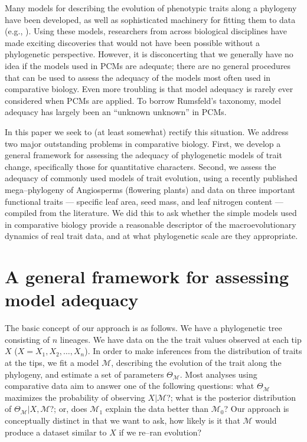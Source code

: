 \documentclass[a4paper,12pt]{article}
\begin{document}
Many models for describing the evolution of phenotypic traits along a phylogeny have been developed, as well as sophisticated machinery for fitting them to data (e.g., \citep{Felsenstein1985, Hansen1997, Pagel1999, Blomberg2003, ButlerKing2004, Omeara2006, Eastman2011, Beaulieu2012, SlaterMEE, UyedaBayou}). Using these models, researchers from across biological disciplines have made exciting discoveries that would not have been possible without a phylogenetic perspective. However, it is disconcerting that we generally have no idea if the models used in PCMs are adequate; there are no general procedures that can be used to assess the adequacy of the models most often used in comparative biology. Even more troubling is that model adequacy is rarely ever considered when PCMs are applied. To borrow Rumsfeld's taxonomy, model adequacy has largely been an ``unknown unknown'' in PCMs.

In this paper we seek to (at least somewhat) rectify this situation. We address two major outstanding problems in comparative biology. First, we develop a general framework for assessing the adequacy of phylogenetic models of trait change, specifically those for quantitative characters. Second, we assess the adequacy of commonly used models of trait evolution, using a recently published mega--phylogeny of Angiosperms (flowering plants) \citep{Zanne2013} and data on three important functional traits --- specific leaf area, seed mass, and leaf nitrogen content --- compiled from the literature. We did this to ask whether the simple models used in comparative biology provide a reasonable descriptor of the macroevolutionary dynamics of real trait data, and at what phylogenetic scale are they appropriate.

\section{A general framework for assessing model adequacy}
The basic concept of our approach is as follows. We have a phylogenetic tree consisting of $n$ lineages. We have data on the the trait values observed at each tip $X$ ($X= X_1, X_2, \ldots, X_n$). In order to make inferences from the distribution of traits at the tips, we fit a model $\mathcal{M}$, describing the evolution of the trait along the phylogeny, and estimate a set of parameters $\Theta_{\mathcal{M}}$. Most analyses using comparative data aim to answer one of the following questions: what $\Theta_{\mathcal{M}}$  maximizes the probability of observing $X|\mathcal{M}$?; what is the posterior distribution of $\Theta_{\mathcal{M}}|X, \mathcal{M}$?; or, does $\mathcal{M}_1$ explain the data better than $\mathcal{M}_0$? Our approach is conceptually distinct in that we want to ask, how likely is it that $\mathcal{M}$ would produce a dataset similar to $X$ if we re--ran evolution?
\end{document}

